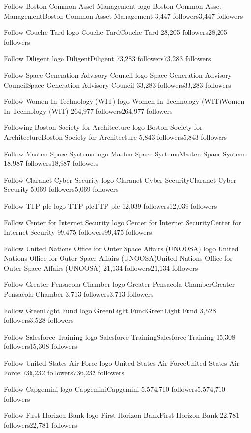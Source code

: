 Follow
Boston Common Asset Management logo
Boston Common Asset ManagementBoston Common Asset Management
3,447 followers3,447 followers

Follow
Couche-Tard logo
Couche-TardCouche-Tard
28,205 followers28,205 followers

Follow
Diligent logo
DiligentDiligent
73,283 followers73,283 followers

Follow
Space Generation Advisory Council logo
Space Generation Advisory CouncilSpace Generation Advisory Council
33,283 followers33,283 followers

Follow
Women In Technology (WIT) logo
Women In Technology (WIT)Women In Technology (WIT)
264,977 followers264,977 followers

Following
Boston Society for Architecture logo
Boston Society for ArchitectureBoston Society for Architecture
5,843 followers5,843 followers

Follow
Masten Space Systems logo
Masten Space SystemsMasten Space Systems
18,987 followers18,987 followers

Follow
Claranet Cyber Security logo
Claranet Cyber SecurityClaranet Cyber Security
5,069 followers5,069 followers

Follow
TTP plc logo
TTP plcTTP plc
12,039 followers12,039 followers

Follow
Center for Internet Security logo
Center for Internet SecurityCenter for Internet Security
99,475 followers99,475 followers

Follow
United Nations Office for Outer Space Affairs (UNOOSA) logo
United Nations Office for Outer Space Affairs (UNOOSA)United Nations Office for Outer Space Affairs (UNOOSA)
21,134 followers21,134 followers

Follow
Greater Pensacola Chamber logo
Greater Pensacola ChamberGreater Pensacola Chamber
3,713 followers3,713 followers

Follow
GreenLight Fund logo
GreenLight FundGreenLight Fund
3,528 followers3,528 followers

Follow
Salesforce Training logo
Salesforce TrainingSalesforce Training
15,308 followers15,308 followers

Follow
United States Air Force logo
United States Air ForceUnited States Air Force
736,232 followers736,232 followers

Follow
Capgemini logo
CapgeminiCapgemini
5,574,710 followers5,574,710 followers

Follow
First Horizon Bank logo
First Horizon BankFirst Horizon Bank
22,781 followers22,781 followers

